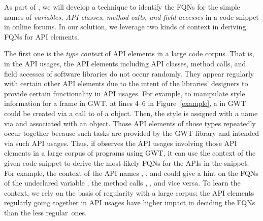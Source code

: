
As part of {\tool}, we will develop a technique to identify the FQNs for
the simple names of {\em variables, API classes, method calls, and
  field accesses} in a code snippet in online forums.
%
In our solution, we leverage two kinds of context in deriving FQNs for
API elements. 

The first one is the {\em type context} of API elements in a
large code corpus. 
That is, in the API usages, the API elements including API classes,
method calls, and field accesses of software libraries do not occur
randomly. They appear regularly with certain other API elements due to
the intent of the libraries' designers to provide certain
functionality in API usages. For example, to manipulate style
information for a frame in GWT, at lines 4--6 in Figure~\ref{example},
a  in GWT could be created via a call to
 of a  object. Then, the style
is assigned with a name via  and
associated with an  object. Those API elements of
those types repeatedly occur together because such tasks are provided
by the GWT library and intended via such API usages. Thus, if {\tool}
observes the API usages involving those API elements in a large corpus
of programs using GWT, it can use the context of the given code
snippet to derive the most likely FQNs for the APIs in the
snippet. For example, the context of the API names
, , and 
could give {\tool} a hint on the FQNs of the undeclared variable
, the method calls ,
, and vice versa.
To learn the context, we rely on the basis of regularity with a large
corpus: the API elements regularly going together in API
usages have higher impact in deciding the FQNs than the less
regular~ones.



